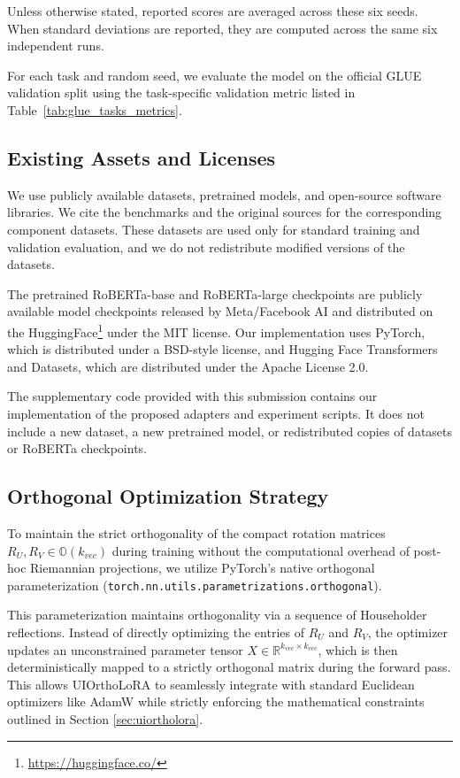 \documentclass{article}
\begin{document}
Unless otherwise stated, reported scores are averaged across these six seeds. When standard deviations are reported, they are computed across the same six independent runs.

For each task and random seed, we evaluate the model on the official GLUE validation split using the task-specific validation metric listed in Table~\ref{tab:glue_tasks_metrics}.

\subsection{Existing Assets and Licenses}
\label{app:assets_licenses}

We use publicly available datasets, pretrained models, and open-source software
libraries. We cite the benchmarks and the original sources for the corresponding component datasets. These datasets are used only for standard training and validation evaluation, and we do not redistribute modified versions
of the datasets.

The pretrained RoBERTa-base and RoBERTa-large checkpoints are publicly available
model checkpoints released by Meta/Facebook AI and distributed on the HuggingFace\footnote{\url{https://huggingface.co/}} under the MIT license. Our implementation uses PyTorch, which is
distributed under a BSD-style license, and Hugging Face Transformers and
Datasets, which are distributed under the Apache License 2.0.

The supplementary code provided with this submission contains our implementation
of the proposed adapters and experiment scripts. It does not include a new
dataset, a new pretrained model, or redistributed copies of datasets or
RoBERTa checkpoints.

\subsection{Orthogonal Optimization Strategy}
\label{app:orthogonal_optimization}

To maintain the strict orthogonality of the compact rotation matrices $R_U, R_V \in \mathbb{O}(k_{vec})$ during training without the computational overhead of post-hoc Riemannian projections, we utilize PyTorch's native orthogonal parameterization (\texttt{torch.nn.utils.parametrizations.orthogonal}). 

This parameterization maintains orthogonality via a sequence of Householder reflections. Instead of directly optimizing the entries of $R_U$ and $R_V$, the optimizer updates an unconstrained parameter tensor $X \in \mathbb{R}^{k_{vec} \times k_{vec}}$, which is then deterministically mapped to a strictly orthogonal matrix during the forward pass. This allows UIOrthoLoRA to seamlessly integrate with standard Euclidean optimizers like AdamW while strictly enforcing the mathematical constraints outlined in Section \ref{sec:uiortholora}.
\end{document}
